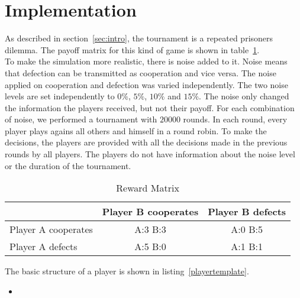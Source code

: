 \section{Implementation}

As described in section~\ref{sec:intro}, the tournament is a repeated prisoners dilemma. The payoff matrix for this kind of game is shown in table~\ref{tab:rewardmatrix}.\\

To make the simulation more realistic, there is noise added to it. Noise means that defection can be transmitted as cooperation and vice versa. The noise applied on cooperation and defection was varied independently. The two noise levels are set independently to $0\%$, $5\%$, $10\%$ and $15\%$. The noise only changed the information the players received, but not their payoff. For each combination of noise, we performed a tournament with $20000$ rounds. In each round, every player plays agains all others and himself in a round robin. To make the decisions, the players are provided with all the decisions made in the previous rounds by all players. The players do not have information about the noise level or the duration of the tournament. \\

\begin{table}[h]

 \begin{center}
\caption{Reward Matrix}\label{tab:rewardmatrix} \vspace{3mm}
\begin{tabular}{|l|c|c|}

\hline
   & Player B cooperates & Player B defects \\
  \hline
  Player A cooperates & A:3 B:3 & A:0 B:5 \\
 \hline
  Player A defects & A:5 B:0 &A:1 B:1 \\
 \hline
\end{tabular}
 \end{center}

\end{table}

The basic structure of a player is shown in listing~\ref{playertemplate}. 

\begin{itemize}\item[]\end{itemize}

